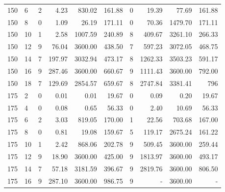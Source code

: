 \begin{appendices}
\begin{table*}[h]
\begin{center}
\begin{tabular} {l l | r r r r | r r r r}
150 & 6   &  2            &  4.23          &  830.02      &  161.88    &  0           &  19.39           &  77.69      &  161.88    \\ 
150 & 8   &  0            &  1.09          &  26.19       &  171.11    &  0           &  70.36           &  1479.70    &  171.11    \\ 
150 & 10  &  1            &  2.58          &  1007.59     &  240.89    &  8           &  409.67          &  3261.10    &  266.33    \\ 
150 & 12  &  9            &  76.04         &  3600.00     &  438.50    &  7           &  597.23          &  3072.05    &  468.75    \\ 
150 & 14  &  7            &  197.97        &  3032.94     &  473.17    &  8           &  1262.33         &  3503.23    &  591.17    \\ 
150 & 16  &  9            &  287.46        &  3600.00     &  660.67    &  9           &  1111.43         &  3600.00    &  792.00    \\ 
150 & 18  &  7            &  129.69        &  2854.57     &  659.67    &  8           &  2747.84         &  3381.41    &  796       \\ 
175 & 2   &  0            &  0.01          &  0.01        &  19.67     &  0           &  0.09            &  0.20       &  19.67     \\ 
175 & 4   &  0            &  0.08          &  0.65        &  56.33     &  0           &  2.40            &  10.69      &  56.33     \\ 
175 & 6   &  2            &  3.03          &  819.05      &  170.00    &  1           &  22.56           &  703.68     &  167.00    \\ 
175 & 8   &  0            &  0.81          &  19.08       &  159.67    &  5           &  119.17          &  2675.24    &  161.22    \\ 
175 & 10  &  1            &  2.42          &  868.06      &  202.78    &  9           &  509.45          &  3600.00    &  259.44    \\ 
175 & 12  &  9            &  18.90         &  3600.00     &  425.00    &  9           &  1813.97         &  3600.00    &  493.17    \\ 
175 & 14  &  7            &  57.18         &  3181.59     &  396.67    &  9           &  2819.76         &  3600.00    &  806.50    \\ 
175 & 16  &  9            &  287.10        &  3600.00     &  986.75    &  9           &  -               &  3600.00    &  -         \\ 

\end{tabular}
\end{center}
\end{table*}
\end{appendices}
